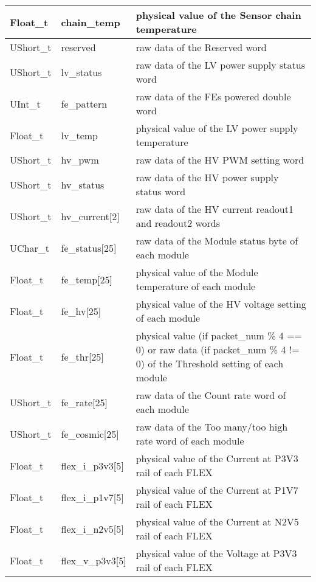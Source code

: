 \documentclass[a4paper, 12pt, onecolumn]{article}
\begin{document}
\begin{center}
\begin{supertabular}{| p{18mm} | p{38mm} | p{66mm} |}
    Float\_t    & chain\_temp              & physical value of the Sensor chain temperature \\\hline
    UShort\_t   & reserved                 & raw data of the Reserved word \\\hline
    UShort\_t   & lv\_status               & raw data of the LV power supply status word \\\hline
    UInt\_t     & fe\_pattern              & raw data of the FEs powered double word \\\hline
    Float\_t    & lv\_temp                 & physical value of the LV power supply temperature \\\hline
    UShort\_t   & hv\_pwm                  & raw data of the HV PWM setting word \\\hline
    UShort\_t   & hv\_status               & raw data of the HV power supply status word \\\hline
    UShort\_t   & hv\_current[2]           & raw data of the HV current readout1 and readout2 words \\\hline
    UChar\_t    & fe\_status[25]           & raw data of the Module status byte of each module \\\hline
    Float\_t    & fe\_temp[25]             & physical value of the Module temperature of each module \\\hline
    Float\_t    & fe\_hv[25]               & physical value of the HV voltage setting of each module \\\hline
    Float\_t    & fe\_thr[25]              & physical value (if packet\_num \% 4 == 0) or raw data (if packet\_num \% 4 != 0) of the Threshold setting of each module \\\hline
    UShort\_t   & fe\_rate[25]             & raw data of the Count rate word of each module \\\hline
    UShort\_t   & fe\_cosmic[25]           & raw data of the Too many/too high rate word of each module \\\hline
    Float\_t    & flex\_i\_p3v3[5]         & physical value of the Current at P3V3 rail of each FLEX \\\hline
    Float\_t    & flex\_i\_p1v7[5]         & physical value of the Current at P1V7 rail of each FLEX \\\hline
    Float\_t    & flex\_i\_n2v5[5]         & physical value of the Current at N2V5 rail of each FLEX \\\hline
    Float\_t    & flex\_v\_p3v3[5]         & physical value of the Voltage at P3V3 rail of each FLEX \\\hline

\end{supertabular}
\end{center}
\end{document}
